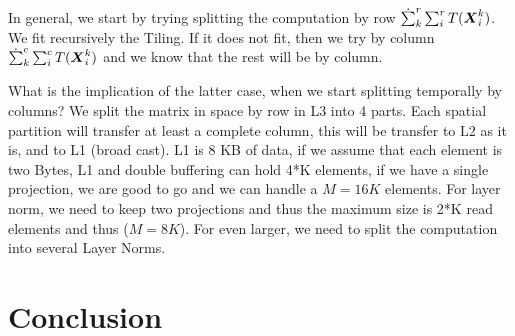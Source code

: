\documentclass[acmsmall]{acmart}
\begin{document}
In general, we start by trying splitting the computation by row
$\dot\sum_k^r\sum_{i}^r T({\boldsymbol X}^{k}_{i})$. We fit recursively the
Tiling. If it does not fit, then we try by column
$\dot\sum_k^c\sum_{i}^c T({\boldsymbol X}^{k}_{i})$ and we know that the rest
will be by column.


What is the implication of the latter case, when we start splitting
temporally by columns? We split the matrix in space by row in L3 into
4 parts. Each spatial partition will transfer at least a complete
column, this will be transfer to L2 as it is, and to L1 (broad cast).
L1 is 8 KB of data, if we assume that each element is two Bytes, L1
and double buffering can hold 4*K elements, if we have a single
projection, we are good to go and we can handle a $M=16K$ elements.
For layer norm, we need to keep two projections and thus the maximum
size is 2*K read elements and thus ($M = 8K$). For even larger, we
need to split the computation into several Layer Norms.





































\section{Conclusion}


  







%

 

%
\end{document}
